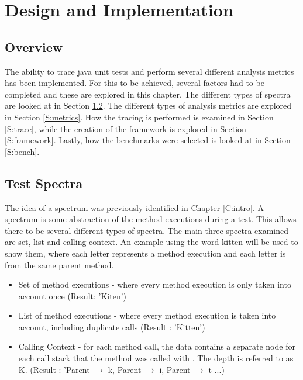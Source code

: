 \chapter{Design and Implementation}\label{C:workdone}

\section{Overview}

The ability to trace java unit tests and perform several different analysis metrics has been implemented. For this to be achieved, several factors had to be completed and these are explored in this chapter. The different types of spectra are looked at in Section \ref{S:spectra}. The different types of analysis metrics are explored in Section \ref{S:metrics}. How the tracing is performed is examined in Section \ref{S:trace}, while the creation of the framework is explored in Section \ref{S:framework}. Lastly, how the benchmarks were selected is looked at in Section \ref{S:bench}.

\section{Test Spectra}
\label{S:spectra}
The idea of a spectrum was previously identified in Chapter \ref{C:intro}. A spectrum is some abstraction of the method executions during a test. This allows there to be several different types of spectra. The main three spectra examined are set, list and calling context. An example using the word kitten will be used to show them, where each letter represents a method execution and each letter is from the same parent method.

\begin{itemize}
\item Set of method executions - where every method execution is only taken into account once (Result: 'Kiten')
\item List of method executions - where every method execution is taken into account, including duplicate calls (Result : 'Kitten')
\item Calling Context - for each method call, the data contains a separate node for each call stack that the method was called with \cite{callingcontext}. The depth is referred to as K. (Result : 'Parent $\rightarrow$ k, Parent $\rightarrow$ i, Parent $\rightarrow$ t ...) 
\end{itemize}

